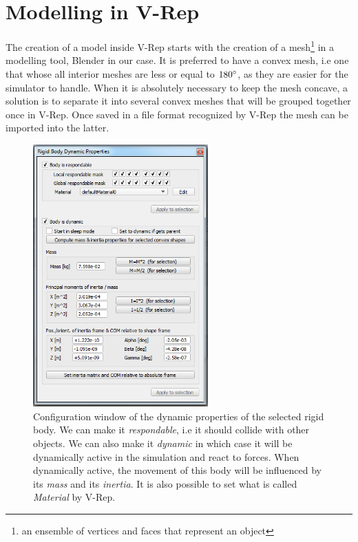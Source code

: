 \section{Modelling in V-Rep \label{sec:modelling}}
The creation of a model inside V-Rep starts with the creation of a mesh\footnote{an ensemble of vertices and faces that represent an object} in a modelling tool, Blender in our case. It is preferred to have a convex mesh, i.e one that whose all interior meshes are less or equal to $180\degree$, as they are easier for the simulator to handle. When it is absolutely necessary to keep the mesh concave, a solution is to separate it into several convex meshes that will be grouped together once in V-Rep. Once saved in a file format recognized by V-Rep the mesh can be imported into the latter. 

\begin{figure}[htp]
\center
    \includegraphics[width = 0.6\textwidth]{figures/v-rep_modelling}
    \caption[Rigid body dynamic properties]{Configuration window of the dynamic properties of the selected rigid body. We can make it \emph{respondable}, i.e it should collide with other objects. We can also make it \emph{dynamic} in which case it will be dynamically active in the simulation and react to forces. When dynamically active, the movement of this body will be influenced by its \emph{mass} and its \emph{inertia}. It is also possible to set what is called \emph{Material} by V-Rep.}
    \label{fig:vrep_modelling}
\end{figure}

